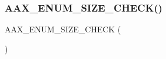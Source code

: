 \subsubsection{\texorpdfstring{AAX\_ENUM\_SIZE\_CHECK()}{AAX\_ENUM\_SIZE\_CHECK()}}
{\footnotesize\ttfamily A\+A\+X\+\_\+\+E\+N\+U\+M\+\_\+\+S\+I\+Z\+E\+\_\+\+C\+H\+E\+CK (\begin{DoxyParamCaption}\item[{\mbox{\hyperlink{a00662_a13e384f22825afd3db6d68395b79ce0d}{A\+A\+X\+\_\+\+E\+Property}}}]{ }\end{DoxyParamCaption})}


